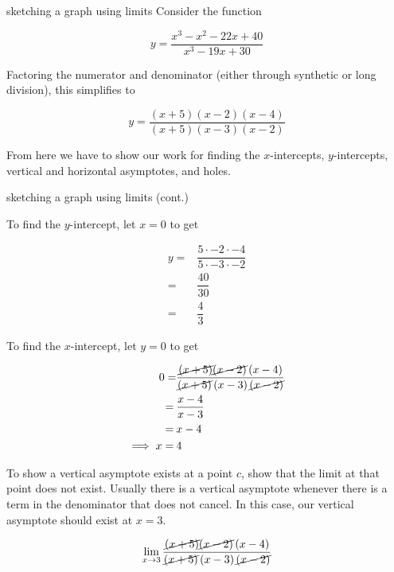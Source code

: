 \begin{example}{sketching a graph using limits}
    Consider the function
    
    \[ y = \dfrac{x^3 - x^2 - 22x + 40}{x^3 - 19x + 30} \]
    
    Factoring the numerator and denominator (either through synthetic or long division), this simplifies to
    
    \[ y = \dfrac{\left( x + 5 \right) \left( x - 2 \right) \left( x - 4 \right)}{\left( x + 5 \right) \left( x - 3 \right) \left( x - 2 \right)} \]
    
    From here we have to show our work for finding the \( x \)-intercepts, \( y \)-intercepts, vertical and horizontal asymptotes, and holes.
\end{example}

\begin{example}{sketching a graph using limits (cont.)}
    
    To find the \( y \)-intercept, let \( x = 0 \) to get
    
    \begin{align}
        y = &\dfrac{5 \cdot -2 \cdot -4}{5 \cdot -3 \cdot -2} \\
        = \> &\dfrac{40}{30} \\
        = \> &\dfrac{4}{3}
    \end{align}
    
    To find the \( x \)-intercept, let \( y = 0 \) to get
    
    \begin{align}
        0 = &\dfrac{\cancel{\left( x + 5 \right)} \cancel{\left( x - 2 \right)} \left( x - 4 \right)}{\cancel{\left( x + 5 \right)} \left( x - 3 \right) \cancel{\left( x - 2 \right)}} \\
        = \> &\dfrac{x - 4}{x - 3} \\
        = \> &x - 4 \\
        \implies x = \> &4
    \end{align}
    
    To show a vertical asymptote exists at a point \( c \), show that the limit at that point does not exist. Usually there is a vertical asymptote whenever there is a term in the denominator that does not cancel. In this case, our vertical asymptote should exist at \( x = 3 \).
    
    \[ \lim_{x \to 3} \dfrac{\cancel{\left( x + 5 \right)} \cancel{\left( x - 2 \right)} \left( x - 4 \right)}{\cancel{\left( x + 5 \right)} \left( x - 3 \right) \cancel{\left( x - 2 \right)}} \]
    

\end{example}
